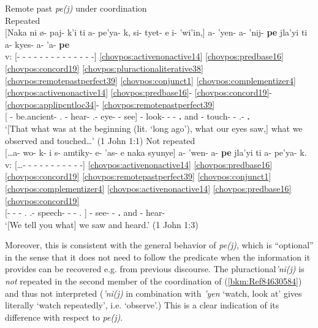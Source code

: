 \documentclass[output=paper]{langscibook}
\begin{document}
\newpage
\ea\label{ex:chor:key:5} Remote past \textit{pe(j)} under coordination\\
    \ea\label{bkm:Ref84630584} Repeated \\ {
    \glll {} [Naka ni ø- paj- k'i ti a- pe'ya- k, si- tyet- e i- 'wi'in,] a- 'yen- a- 'nij- \textbf{pe} jla'yi ti a- kyes- a- 'a- \textbf{pe} \\
    v: [- - - - - - - - - - - - - -] \ref{chovpos:activenonactive14} \ref{chovpos:predbase16} \ref{chovpos:concord19} \ref{chovpos:pluractionaliterative38} \ref{chovpos:remotepastperfect39} \ref{chovpos:conjunct1} \ref{chovpos:complementizer4} \ref{chovpos:activenonactive14} \ref{chovpos:predbase16}- \ref{chovpos:concord19}- \ref{chovpos:applipcntloc34}- \ref{chovpos:remotepastperfect39} \\ 
    {} [\Dem{} \Dem{} \Third{}- be.ancient- \Ap.\Distr{} \Comp{} \First{}- hear- \First\Pl{} \First\Pl.\Poss{}- eye- \Pl{} \Third{}- see] \First{}- look- \First\Pl{}- \Plact{}- \textbf{\Rem.\Pst{}} and \Comp{} \First{}- touch- \First\Pl{}- \Ap.\Punct{}- \textbf{\Rem.\Pst{}}\\ 
    \glt `[That what was at the beginning (lit. `long ago'), what our eyes saw,] what we observed and touched…' (1 John 1:1)
    }
    \ex\label{bkm:Ref84630586} Not repeated\\ {
    \glll {} […a- wo- k- i s- amtiky- e- 'as- e naka syunye] a- 'wen- a- \textbf{pe} jla'yi ti a- pe'ya- k.\\
    v: […- - - - - - - - - - -] \ref{chovpos:activenonactive14} \ref{chovpos:predbase16} \ref{chovpos:concord19} \ref{chovpos:remotepastperfect39} \ref{chovpos:conjunct1} \ref{chovpos:complementizer4} \ref{chovpos:activenonactive14} \ref{chovpos:predbase16} \ref{chovpos:concord19}\\
    {} [\First{}- \Lv{}- \First\Pl{}- \Ap.\Dist{} \First\Pl.\Poss{}- speech- \Irr{}- \Second\Pl{}- \Ap.\Dist{} \Dem{} \Dem{}] \First{}- see- \First\Pl{}- \textbf{\Rem.\Pst{}} and \Comp{} \First{}- hear- \First\Pl{} \\
    \glt `[We tell you what] we saw and heard.' (1 John 1:3) }
    \z 
\z 
 
Moreover, this is consistent with the general behavior of \textit{pe(j)}, which is ``optional'' in the sense that it does not need to follow the predicate when the information it provides can be recovered e.g. from previous discourse. The pluractional\textit{'ni(j)} is \textit{not} repeated in the second member of the coordination of (\ref{bkm:Ref84630584}) and thus not interpreted (\textit{'ni(j)} in combination with \textit{'yen} `watch, look at' gives literally `watch repeatedly', i.e. `observe'.) This is a clear indication of its difference with respect to \textit{pe(j)}.
\end{document}
